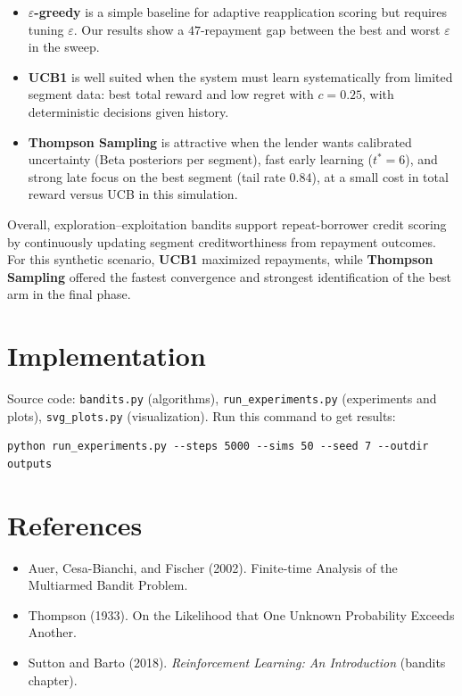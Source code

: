 \documentclass[11pt,a4paper]{article}
\begin{document}
\begin{itemize}
  \item \textbf{$\varepsilon$-greedy} is a simple baseline for adaptive reapplication scoring but requires tuning $\varepsilon$. Our results show a $47$-repayment gap between the best and worst $\varepsilon$ in the sweep.
  \item \textbf{UCB1} is well suited when the system must learn systematically from limited segment data: best total reward and low regret with $c{=}0.25$, with deterministic decisions given history.
  \item \textbf{Thompson Sampling} is attractive when the lender wants calibrated uncertainty (Beta posteriors per segment), fast early learning ($t^\ast{=}6$), and strong late focus on the best segment (tail rate $0.84$), at a small cost in total reward versus UCB in this simulation.
\end{itemize}

Overall, exploration--exploitation bandits support repeat-borrower credit scoring by continuously updating segment creditworthiness from repayment outcomes. For this synthetic scenario, \textbf{UCB1} maximized repayments, while \textbf{Thompson Sampling} offered the fastest convergence and strongest identification of the best arm in the final phase.

\section{Implementation}

Source code: \texttt{bandits.py} (algorithms), \texttt{run\_experiments.py} (experiments and plots), \texttt{svg\_plots.py} (visualization). Run this command to get results:
\begin{verbatim}
python run_experiments.py --steps 5000 --sims 50 --seed 7 --outdir outputs
\end{verbatim}

\section*{References}
\begin{itemize}[noitemsep]
  \item Auer, Cesa-Bianchi, and Fischer (2002). Finite-time Analysis of the Multiarmed Bandit Problem.
  \item Thompson (1933). On the Likelihood that One Unknown Probability Exceeds Another.
  \item Sutton and Barto (2018). \emph{Reinforcement Learning: An Introduction} (bandits chapter).
\end{itemize}
\end{document}
